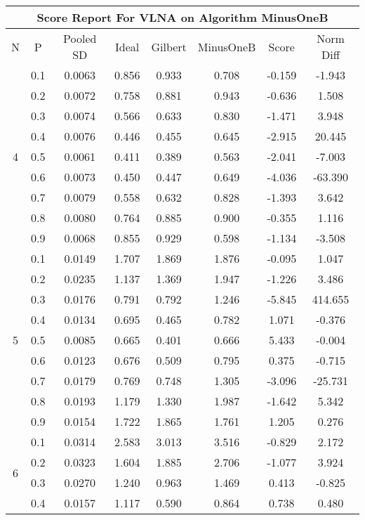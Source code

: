 \documentclass[11pt,a4paper]{report}
\begin{document}
\begin{longtable}{ | c | c || c | c | c | c | c | c | }
\hline
\multicolumn{8}{|c|}{ Score Report For VLNA on Algorithm MinusOneB} \\
\hline
N & P & Pooled SD &  Ideal &  Gilbert & MinusOneB  & Score & Norm Diff \\
 \hline
 \hline
 \endhead
\multirow{9}{*}{4} & 0.1 & 0.0063 & 0.856 & 0.933 & 0.708 & -0.159 & -1.943 \\
 & 0.2 & 0.0072 & 0.758 & 0.881 & 0.943 & -0.636 & 1.508 \\
 & 0.3 & 0.0074 & 0.566 & 0.633 & 0.830 & -1.471 & 3.948 \\
 & 0.4 & 0.0076 & 0.446 & 0.455 & 0.645 & -2.915 & 20.445 \\
 & 0.5 & 0.0061 & 0.411 & 0.389 & 0.563 & -2.041 & -7.003 \\
 & 0.6 & 0.0073 & 0.450 & 0.447 & 0.649 & -4.036 & -63.390 \\
 & 0.7 & 0.0079 & 0.558 & 0.632 & 0.828 & -1.393 & 3.642 \\
 & 0.8 & 0.0080 & 0.764 & 0.885 & 0.900 & -0.355 & 1.116 \\
 & 0.9 & 0.0068 & 0.855 & 0.929 & 0.598 & -1.134 & -3.508 \\
 \hline
\multirow{9}{*}{5} & 0.1 & 0.0149 & 1.707 & 1.869 & 1.876 & -0.095 & 1.047 \\
 & 0.2 & 0.0235 & 1.137 & 1.369 & 1.947 & -1.226 & 3.486 \\
 & 0.3 & 0.0176 & 0.791 & 0.792 & 1.246 & -5.845 & 414.655 \\
 & 0.4 & 0.0134 & 0.695 & 0.465 & 0.782 & 1.071 & -0.376 \\
 & 0.5 & 0.0085 & 0.665 & 0.401 & 0.666 & 5.433 & -0.004 \\
 & 0.6 & 0.0123 & 0.676 & 0.509 & 0.795 & 0.375 & -0.715 \\
 & 0.7 & 0.0179 & 0.769 & 0.748 & 1.305 & -3.096 & -25.731 \\
 & 0.8 & 0.0193 & 1.179 & 1.330 & 1.987 & -1.642 & 5.342 \\
 & 0.9 & 0.0154 & 1.722 & 1.865 & 1.761 & 1.205 & 0.276 \\
 \hline
\multirow{9}{*}{6} & 0.1 & 0.0314 & 2.583 & 3.013 & 3.516 & -0.829 & 2.172 \\
 & 0.2 & 0.0323 & 1.604 & 1.885 & 2.706 & -1.077 & 3.924 \\
 & 0.3 & 0.0270 & 1.240 & 0.963 & 1.469 & 0.413 & -0.825 \\
 & 0.4 & 0.0157 & 1.117 & 0.590 & 0.864 & 0.738 & 0.480 \\

\end{longtable}
\end{document}
